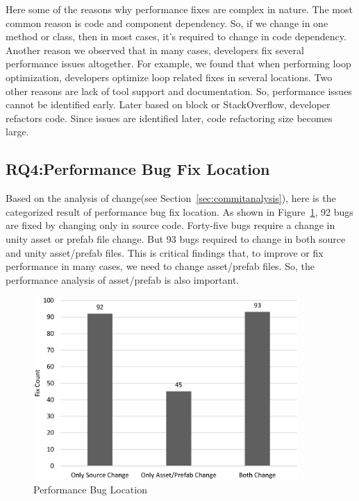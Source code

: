 Here some of the reasons why performance fixes are complex in nature. The most common reason is code and component dependency. So, if we change in one method or class, then in most cases, it's required to change in code dependency.  Another reason we observed that in many cases, developers fix several performance issues altogether.  For example, we found that when performing loop optimization, developers optimize loop related fixes in several locations. Two other reasons are lack of tool support and documentation. So, performance issues cannot be identified early. Later based on block or StackOverflow, developer refactors code. Since issues are identified later, code refactoring size becomes large.

\subsection{RQ4:Performance Bug Fix Location}
\label{subsec:bugcomplexity}
Based on the analysis of change(see Section~\ref{sec:commitanalysis}), here is the categorized result of performance bug fix location. As shown in Figure~\ref{figure:rq4}, 92 bugs are fixed by changing only in source code. Forty-five bugs require a change in unity asset or prefab file change. But 93 bugs required to change in both source and unity asset/prefab files. This is critical findings that, to improve or fix performance in many cases, we need to change asset/prefab files. So, the performance analysis of asset/prefab is also important.

\begin{figure}[t]
	\centering
	\includegraphics[width=0.9\textwidth]{figure/rq4_1.eps}
	\caption{Performance Bug Location}
	\label{figure:rq4}
\end{figure}


